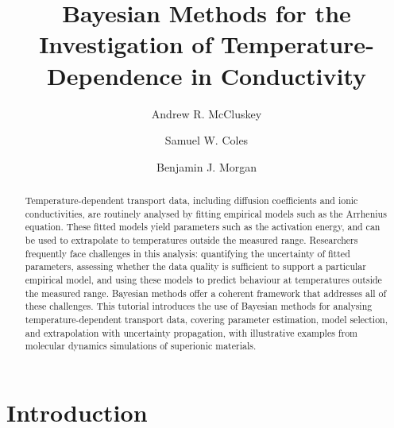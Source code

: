 \documentclass[reprint,superscriptaddress,nobibnotes,nofootinbib,amsmath,amssymb,aps,hidelinks]{revtex4-2}
\title@column\titleblock@produce
\makeatletter
\newcommand{\papertitle}{Bayesian Methods for the Investigation of Temperature-Dependence in Conductivity}
\def\maketitle{
\@author@finish
\title@column\titleblock@produce
\suppressfloats[t]}
\makeatother
\begin{document}
\let\oldaddcontentsline\addcontentsline
\renewcommand{\addcontentsline}[3]{}

\title{\papertitle}

\author{Andrew R. McCluskey}
\author{Samuel W. Coles}
\author{Benjamin J. Morgan}


\begin{abstract}
Temperature-dependent transport data, including diffusion coefficients and ionic conductivities, are routinely analysed by fitting empirical models such as the Arrhenius equation. 
These fitted models yield parameters such as the activation energy, and can be used to extrapolate to temperatures outside the measured range.
Researchers frequently face challenges in this analysis: quantifying the uncertainty of fitted parameters, assessing whether the data quality is sufficient to support a particular empirical model, and using these models to predict behaviour at temperatures outside the measured range. 
Bayesian methods offer a coherent framework that addresses all of these challenges. 
This tutorial introduces the use of Bayesian methods for analysing temperature-dependent transport data, covering parameter estimation, model selection, and extrapolation with uncertainty propagation, with illustrative examples from molecular dynamics simulations of superionic materials.
\end{abstract}

\maketitle

\section{Introduction}
\label{sec:intro}
\end{document}
